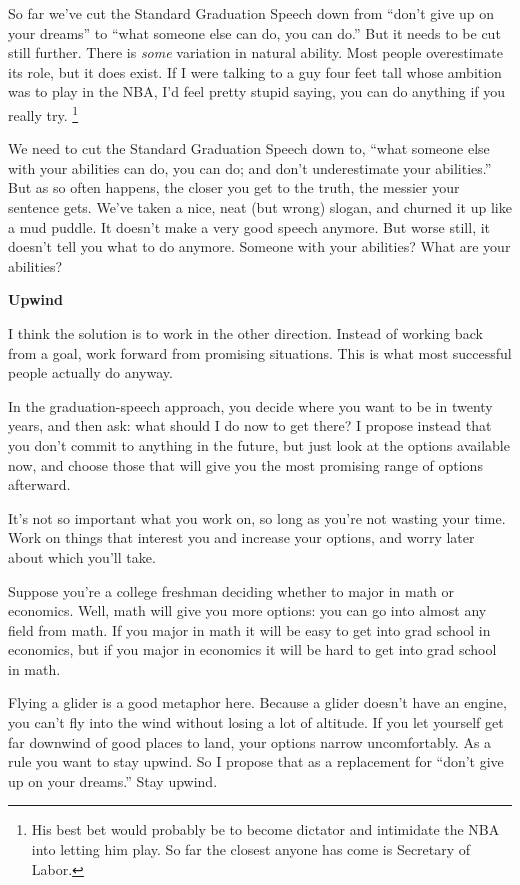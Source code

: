 \documentclass[12pt]{book}
\begin{document}
So far we've cut the Standard Graduation Speech down from ``don't give
up on your dreams'' to ``what someone else can do, you can do.'' But it
needs to be cut still further. There is \emph{some} variation in natural
ability. Most people overestimate its role, but it does exist. If I were
talking to a guy four feet tall whose ambition was to play in the NBA,
I'd feel pretty stupid saying, you can do anything if you really try.
\footnote{His best bet would probably be to become dictator and intimidate
the NBA into letting him play. So far the closest anyone has come is
Secretary of Labor.}

We need to cut the Standard Graduation Speech down to, ``what someone
else with your abilities can do, you can do; and don't underestimate
your abilities.'' But as so often happens, the closer you get to the
truth, the messier your sentence gets. We've taken a nice, neat (but
wrong) slogan, and churned it up like a mud puddle. It doesn't make a
very good speech anymore. But worse still, it doesn't tell you what to
do anymore. Someone with your abilities? What are your abilities?

\textbf{Upwind}

I think the solution is to work in the other direction. Instead of
working back from a goal, work forward from promising situations. This
is what most successful people actually do anyway.

In the graduation-speech approach, you decide where you want to be in
twenty years, and then ask: what should I do now to get there? I propose
instead that you don't commit to anything in the future, but just look
at the options available now, and choose those that will give you the
most promising range of options afterward.

It's not so important what you work on, so long as you're not wasting
your time. Work on things that interest you and increase your options,
and worry later about which you'll take.

Suppose you're a college freshman deciding whether to major in math or
economics. Well, math will give you more options: you can go into almost
any field from math. If you major in math it will be easy to get into
grad school in economics, but if you major in economics it will be hard
to get into grad school in math.

Flying a glider is a good metaphor here. Because a glider doesn't have
an engine, you can't fly into the wind without losing a lot of altitude.
If you let yourself get far downwind of good places to land, your
options narrow uncomfortably. As a rule you want to stay upwind. So I
propose that as a replacement for ``don't give up on your dreams.'' Stay
upwind.
\end{document}
